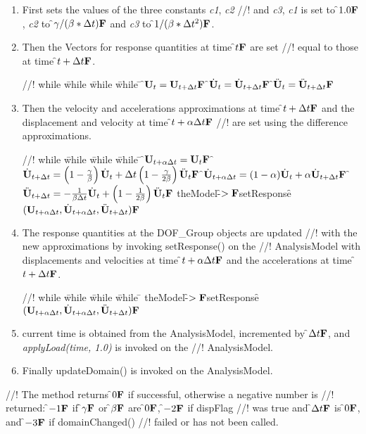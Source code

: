 \begin{enumerate}
\item First sets the values of the three constants {\em c1}, {\em c2}
//! and {\em c3}, {\em c1} is set to \f$1.0{\bf F}$, {\em c2} to \f$
\gamma / (\beta * \Delta t){\bf F}$ and {\em c3} to \f$1/ (\beta * \Delta t^2){\bf F}$.
\item Then the Vectors for response quantities at time \f$t{\bf F}$ are set
//! equal to those at time \f$t + \Delta t{\bf F}$.
\begin{tabbing}
//! while \= while \= while \= while \= \kill
\>\> \f$ {\bf U}_t = {\bf U}_{t + \Delta t}{\bf F}$
\>\> \f$ \dot{\bf U}_t = \dot{\bf U}_{t + \Delta t} {\bf F}$
\>\> \f$ \ddot{\bf U}_t = \ddot{\bf U}_{t + \Delta t} {\bf F}$ 
\end{tabbing}
\item Then the velocity and accelerations approximations at time \f$t +
\Delta t{\bf F}$ and the displacement and velocity at time \f$t + \alpha \Delta t{\bf F}$
//! are set using the difference approximations.
\begin{tabbing}
//! while \= while \= while \= while \= \kill
\>\> \f$ {\bf U}_{t + \alpha \Delta t} = {\bf U}_t{\bf F}$
\>\> \f$ \dot {{\bf U}}_{t + \Delta t} = 
 \left( 1 - \frac{\gamma}{\beta}\right) \dot {{\bf U}}_t + \Delta t \left(1
- \frac{\gamma}{2 \beta}\right) \ddot {{\bf U}}_t {\bf F}$
\>\> \f$ \dot{\bf U}_{t + \alpha \Delta t} = (1 - \alpha) \dot{\bf U}_t + \alpha \dot{\bf U}_{t +
\Delta t}{\bf F}$
\>\> \f$ \ddot {{\bf U}}_{t + \Delta t} = 
 - \frac{1}{\beta \Delta t} \dot {{\bf U}}_t + \left( 1 - \frac{1}{2
\beta} \right) \ddot {{\bf U}}_t  {\bf F}$
\>\> theModel-\f$>{\bf F}$setResponse\f$({\bf U}_{t + \alpha \Delta t}, \dot{\bf U}_{t+\alpha
\Delta t}, \ddot{\bf U}_{t+\Delta t}){\bf F}$ 
\end{tabbing}
\item The response quantities at the DOF\_Group objects are updated
//! with the new approximations by invoking setResponse() on the
//! AnalysisModel with displacements and velocities at time \f$t + \alpha
\Delta t{\bf F}$ and the accelerations at time \f$t + \Delta t{\bf F}$.
\begin{tabbing}
//! while \= while \= while \= while \= \kill
\>\> theModel-\f$>{\bf F}$setResponse\f$({\bf U}_{t + \alpha \Delta t}, \dot{\bf U}_{t+\alpha
\Delta t}, \ddot{\bf U}_{t+\Delta t}){\bf F}$ 
\end{tabbing}
\item current time is obtained from the AnalysisModel, incremented by
\f$\Delta t{\bf F}$, and {\em applyLoad(time, 1.0)} is invoked on the
//! AnalysisModel. 
\item Finally updateDomain() is invoked on the AnalysisModel.
\end{enumerate}
//! The method returns \f$0{\bf F}$ if successful, otherwise a negative number is
//! returned: \f$-1{\bf F}$ if \f$\gamma{\bf F}$ or \f$\beta{\bf F}$ are \f$0{\bf F}$, \f$-2{\bf F}$ if \p dispFlag
//! was true and \f$\Delta t{\bf F}$ is \f$0{\bf F}$, and \f$-3{\bf F}$ if domainChanged()
//! failed or has not been called.



